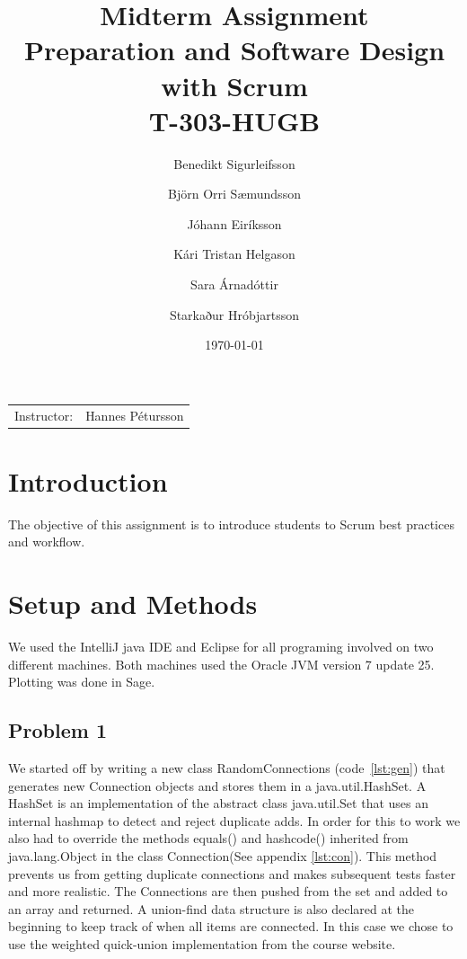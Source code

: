 \documentclass{article}
\title{Midterm Assignment\\ Preparation and Software Design with Scrum \\ T-303-HUGB} %
\author{Benedikt Sigurleifsson \and Björn Orri Sæmundsson \and Jóhann Eiríksson \and Kári Tristan Helgason \and Sara Árnadóttir \and Starkaður Hróbjartsson} %
\date{\today} %
\begin{document}
\maketitle %

\begin{center}
\begin{tabular}{l r}
Instructor: & Hannes Pétursson %
\end{tabular}
\end{center}



\section{Introduction}

The objective of this assignment is to introduce students to Scrum best practices and workflow. 

 
\pagebreak

\section{Setup and Methods}
We used the IntelliJ java IDE and Eclipse for all programing involved on two different machines. Both machines used the Oracle JVM version 7 update 25. Plotting was done in Sage.
\subsection*{Problem 1}
We started off by writing a new class RandomConnections (code~\ref{lst:gen}) that generates new Connection objects and stores them in a java.util.HashSet. A HashSet is an implementation of the abstract class java.util.Set that uses an internal hashmap to detect and reject duplicate adds. In order for this to work we also had to override the methods equals() and hashcode() inherited from java.lang.Object in the class Connection(See appendix \ref{lst:con}). This method prevents us from getting duplicate connections and makes subsequent tests faster and more realistic. The Connections are then pushed from the set and added to an array and returned. A union-find data structure is also declared at the beginning to keep track of when all items are connected. In this case we chose to use the weighted quick-union implementation from the course website\cite{Algs4}.
\end{document}
